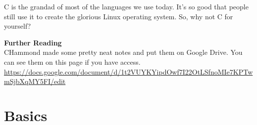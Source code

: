 C is the grandad of most of the languages we use today. It's so good that people still use it to create the glorious Linux operating system. So, why not C for yourself?

\textbf{Further Reading}\\
CHammond made some pretty neat notes and put them on Google Drive. You can see them on this page if you have access. \url{https://docs.google.com/document/d/1t2VUYKYipdOwf7I22OtLSfnoMIe7KPTwmSjbXqMY5FI/edit}

\section{Basics}

